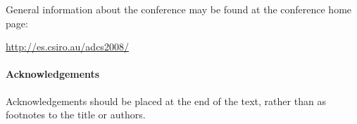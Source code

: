 \documentclass[twocolumn]{article}
\begin{document}
General information about the conference may be found at the
conference home page: 

\begin{center}
\url{http://es.csiro.au/adcs2008/}
\end{center}

\paragraph*{Acknowledgements}

Acknowledgements should be placed at the end of the text, rather than
as footnotes to the title or authors.

\begin{small}

\end{small}
\end{document}
